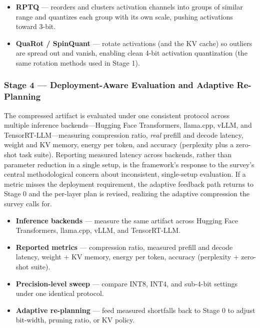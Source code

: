 \begin{itemize}

  \item \textbf{RPTQ} \cite{yuan2023rptq} --- reorders and clusters activation channels into groups of similar range and quantizes each group with its own scale, pushing activations toward 3-bit.

  \item \textbf{QuaRot / SpinQuant} \cite{ashkboos2024quarot,liu2025spinquant} --- rotate activations (and the KV cache) so outliers are spread out and vanish, enabling clean 4-bit activation quantization (the same rotation methods used in Stage 1).

\end{itemize}

\subsubsection{Stage 4 --- Deployment-Aware Evaluation and Adaptive Re-Planning}

The compressed artifact is evaluated under one consistent protocol across multiple inference backends---Hugging Face Transformers, llama.cpp, vLLM, and TensorRT-LLM---measuring compression ratio, \emph{real} prefill and decode latency, weight and KV memory, energy per token, and accuracy (perplexity plus a zero-shot task suite). Reporting measured latency across backends, rather than parameter reduction in a single setup, is the framework's response to the survey's central methodological concern about inconsistent, single-setup evaluation. If a metric misses the deployment requirement, the adaptive feedback path returns to Stage 0 and the per-layer plan is revised, realizing the adaptive compression the survey calls for.

\begin{itemize}

  \item \textbf{Inference backends} --- measure the same artifact across Hugging Face Transformers, llama.cpp, vLLM, and TensorRT-LLM.

  \item \textbf{Reported metrics} --- compression ratio, measured prefill and decode latency, weight + KV memory, energy per token, accuracy (perplexity + zero-shot suite).

  \item \textbf{Precision-level sweep} --- compare INT8, INT4, and sub-4-bit settings under one identical protocol.

  \item \textbf{Adaptive re-planning} --- feed measured shortfalls back to Stage 0 to adjust bit-width, pruning ratio, or KV policy.

\end{itemize}

